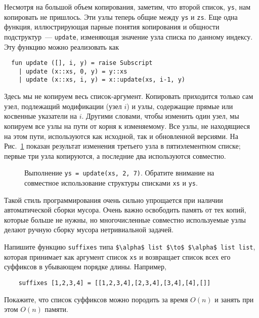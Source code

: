 Несмотря на большой объем копирования, заметим, что второй список, \lstinline!ys!, нам
копировать не пришлось. Эти узлы теперь общие между
\lstinline!ys! и \lstinline!zs!. Еще одна функция, иллюстрирующая
парные понятия копирования и общности подструктур~---
\lstinline!update!, изменяющая значение узла списка по данному
индексу. Эту функцию можно реализовать как
\begin{lstlisting}
  fun update ([], i, y) = raise Subscript
    | update (x::xs, 0, y) = y::xs
    | update (x::xs, i, y) = x::update(xs, i-1, y)
\end{lstlisting}
Здесь мы не копируем весь список-аргумент. Копировать приходится
только сам узел, подлежащий модификации (узел $i$) и узлы,
содержащие прямые или косвенные указатели на $i$.  Другими словами,
чтобы изменить один узел, мы копируем все узлы на пути от корня
к изменяемому. Все узлы, не находящиеся на этом пути, используются как
исходной, так и обновленной версиями. На Рис.~\ref{fig:2.6} показан
результат изменения третьего узла в пятиэлементном списке; первые
три узла копируются, а последние два используются совместно.

\begin{figure}
  \centering

  \caption{Выполнение \lstinline!ys = update(xs, 2, 7)!. Обратите
    внимание на совместное использование структуры списками \lstinline!xs! и \lstinline!ys!.}
  \label{fig:2.6}
\end{figure}

\begin{remark}
  Такой стиль программирования очень сильно упрощается при наличии
  автоматической сборки мусора. Очень важно освободить память от тех
  копий, которые больше не нужны, но многочисленные совместно используемые
  узлы делают ручную сборку мусора нетривиальной задачей.
\end{remark}

\begin{exercise}\label{ex:2.1}
  Напишите функцию \lstinline!suffixes! типа
  \lstinline!$\alpha$ list $\to$ $\alpha$ list list!, которая принимает как
  аргумент список \lstinline!xs! и возвращает список всех его
  суффиксов в убывающем порядке длины. Например,
  \begin{lstlisting}
    suffixes [1,2,3,4] = [[1,2,3,4],[2,3,4],[3,4],[4],[]]
  \end{lstlisting}
  Покажите, что список суффиксов можно породить за время $O(n)$ и
  занять при этом $O(n)$ памяти.
\end{exercise}

